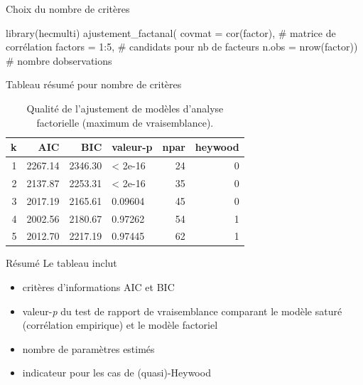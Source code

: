 \documentclass[
  ignorenonframetext,
]{beamer}
\newenvironment{Shaded}{\begin{snugshade}}{\end{snugshade}}
\newcommand{\AttributeTok}[1]{\textcolor[rgb]{0.40,0.45,0.13}{#1}}
\newcommand{\CommentTok}[1]{\textcolor[rgb]{0.37,0.37,0.37}{#1}}
\newcommand{\DecValTok}[1]{\textcolor[rgb]{0.68,0.00,0.00}{#1}}
\newcommand{\FunctionTok}[1]{\textcolor[rgb]{0.28,0.35,0.67}{#1}}
\newcommand{\NormalTok}[1]{\textcolor[rgb]{0.00,0.23,0.31}{#1}}
\newcommand{\SpecialCharTok}[1]{\textcolor[rgb]{0.37,0.37,0.37}{#1}}
\begin{document}
\begin{frame}[fragile]{Choix du nombre de critères}
\protect\hypertarget{choix-du-nombre-de-crituxe8res}{}
\begin{Shaded}
\begin{Highlighting}[]
\FunctionTok{library}\NormalTok{(hecmulti)}
\FunctionTok{ajustement\_factanal}\NormalTok{(}
    \AttributeTok{covmat =} \FunctionTok{cor}\NormalTok{(factor), }\CommentTok{\# matrice de corrélation}
    \AttributeTok{factors =} \DecValTok{1}\SpecialCharTok{:}\DecValTok{5}\NormalTok{, }\CommentTok{\# candidats pour nb de facteurs}
    \AttributeTok{n.obs =} \FunctionTok{nrow}\NormalTok{(factor)) }\CommentTok{\# nombre d\textquotesingle{}observations}
\end{Highlighting}
\end{Shaded}
\end{frame}

\begin{frame}{Tableau résumé pour nombre de critères}
\protect\hypertarget{tableau-ruxe9sumuxe9-pour-nombre-de-crituxe8res}{}
\hypertarget{tbl-emvcrit}{}
\begin{table}
\caption{\label{tbl-emvcrit}Qualité de l'ajustement de modèles d'analyse factorielle (maximum de
vraisemblance). }\tabularnewline

\centering
\begin{tabular}{rrrlrr}
\toprule
k & AIC & BIC & valeur-p & npar & heywood\\
\midrule
1 & 2267.14 & 2346.30 & < 2e-16 & 24 & 0\\
2 & 2137.87 & 2253.31 & < 2e-16 & 35 & 0\\
3 & 2017.19 & 2165.61 & 0.09604 & 45 & 0\\
4 & 2002.56 & 2180.67 & 0.97262 & 54 & 1\\
5 & 2012.70 & 2217.19 & 0.97445 & 62 & 1\\
\bottomrule
\end{tabular}
\end{table}
\end{frame}

\begin{frame}{Résumé}
\protect\hypertarget{ruxe9sumuxe9}{}
Le tableau inclut

\begin{itemize}
\item
  critères d'informations AIC et BIC
\item
  valeur-\emph{p} du test de rapport de vraisemblance comparant le
  modèle saturé (corrélation empirique) et le modèle factoriel
\item
  nombre de paramètres estimés
\item
  indicateur pour les cas de (quasi)-Heywood
\end{itemize}
\end{frame}
\end{document}
